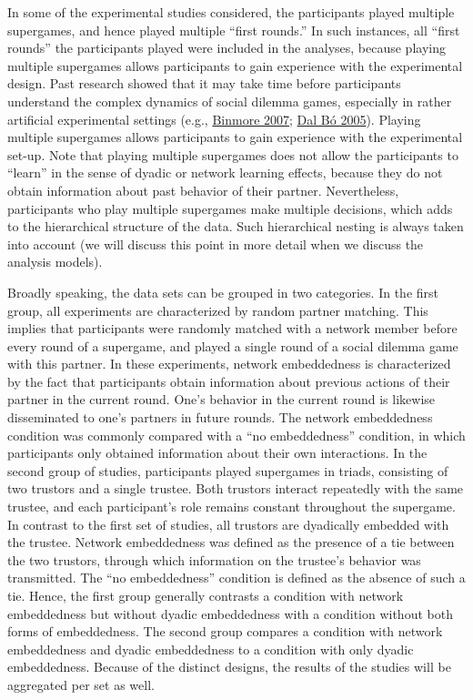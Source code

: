 \documentclass[
  11pt,
]{article}
\begin{document}
In some of the experimental studies considered, the participants played multiple supergames, and hence played multiple ``first rounds.''
In such instances, all ``first rounds'' the participants played were included in the analyses, because playing multiple supergames allows participants to gain experience with the experimental design.
Past research showed that it may take time before participants understand the complex dynamics of social dilemma games, especially in rather artificial experimental settings (e.g., \protect\hyperlink{ref-binmore_playing_2007}{Binmore 2007}; \protect\hyperlink{ref-dal_buxf3_cooperation_2005}{Dal Bó 2005}).
Playing multiple supergames allows participants to gain experience with the experimental set-up.
Note that playing multiple supergames does not allow the participants to ``learn'' in the sense of dyadic or network learning effects, because they do not obtain information about past behavior of their partner.
Nevertheless, participants who play multiple supergames make multiple decisions, which adds to the hierarchical structure of the data.
Such hierarchical nesting is always taken into account (we will discuss this point in more detail when we discuss the analysis models).

Broadly speaking, the data sets can be grouped in two categories.
In the first group, all experiments are characterized by random partner matching.
This implies that participants were randomly matched with a network member before every round of a supergame, and played a single round of a social dilemma game with this partner.
In these experiments, network embeddedness is characterized by the fact that participants obtain information about previous actions of their partner in the current round.
One's behavior in the current round is likewise disseminated to one's partners in future rounds.
The network embeddedness condition was commonly compared with a ``no embeddedness'' condition, in which participants only obtained information about their own interactions.
In the second group of studies, participants played supergames in triads, consisting of two trustors and a single trustee.
Both trustors interact repeatedly with the same trustee, and each participant's role remains constant throughout the supergame.
In contrast to the first set of studies, all trustors are dyadically embedded with the trustee.
Network embeddedness was defined as the presence of a tie between the two trustors, through which information on the trustee's behavior was transmitted.
The ``no embeddedness'' condition is defined as the absence of such a tie.
Hence, the first group generally contrasts a condition with network embeddedness but without dyadic embeddedness with a condition without both forms of embeddedness.
The second group compares a condition with network embeddedness and dyadic embeddedness to a condition with only dyadic embeddedness.
Because of the distinct designs, the results of the studies will be aggregated per set as well.
\end{document}
